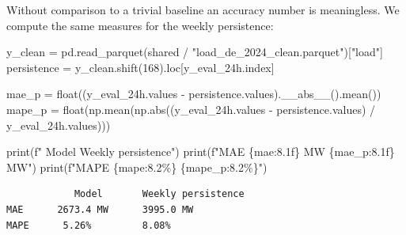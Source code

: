 \documentclass[
  english,
  letterpaper,
]{scrbook}
\newenvironment{Shaded}{\begin{snugshade}}{\end{snugshade}}
\newcommand{\BuiltInTok}[1]{\textcolor[rgb]{0.00,0.23,0.31}{#1}}
\newcommand{\DecValTok}[1]{\textcolor[rgb]{0.68,0.00,0.00}{#1}}
\newcommand{\FunctionTok}[1]{\textcolor[rgb]{0.28,0.35,0.67}{#1}}
\newcommand{\NormalTok}[1]{\textcolor[rgb]{0.00,0.23,0.31}{#1}}
\newcommand{\OperatorTok}[1]{\textcolor[rgb]{0.37,0.37,0.37}{#1}}
\newcommand{\SpecialCharTok}[1]{\textcolor[rgb]{0.37,0.37,0.37}{#1}}
\newcommand{\SpecialStringTok}[1]{\textcolor[rgb]{0.13,0.47,0.30}{#1}}
\newcommand{\StringTok}[1]{\textcolor[rgb]{0.13,0.47,0.30}{#1}}
\begin{document}
Without comparison to a trivial baseline an accuracy number is
meaningless. We compute the same measures for the weekly persistence:

\protect{}\label{baseline-metrics}
\begin{Shaded}
\begin{Highlighting}[]
\NormalTok{y\_clean }\OperatorTok{=}\NormalTok{ pd.read\_parquet(shared }\OperatorTok{/} \StringTok{"load\_de\_2024\_clean.parquet"}\NormalTok{)[}\StringTok{"load"}\NormalTok{]}
\NormalTok{persistence }\OperatorTok{=}\NormalTok{ y\_clean.shift(}\DecValTok{168}\NormalTok{).loc[y\_eval\_24h.index]}

\NormalTok{mae\_p  }\OperatorTok{=} \BuiltInTok{float}\NormalTok{((y\_eval\_24h.values }\OperatorTok{{-}}\NormalTok{ persistence.values).}\FunctionTok{\_\_abs\_\_}\NormalTok{().mean())}
\NormalTok{mape\_p }\OperatorTok{=} \BuiltInTok{float}\NormalTok{(np.mean(np.}\BuiltInTok{abs}\NormalTok{((y\_eval\_24h.values }\OperatorTok{{-}}\NormalTok{ persistence.values) }\OperatorTok{/}\NormalTok{ y\_eval\_24h.values)))}

\BuiltInTok{print}\NormalTok{(}\SpecialStringTok{f"            Model       Weekly persistence"}\NormalTok{)}
\BuiltInTok{print}\NormalTok{(}\SpecialStringTok{f"MAE    }\SpecialCharTok{\{}\NormalTok{mae}\SpecialCharTok{:8.1f\}}\SpecialStringTok{ MW    }\SpecialCharTok{\{}\NormalTok{mae\_p}\SpecialCharTok{:8.1f\}}\SpecialStringTok{ MW"}\NormalTok{)}
\BuiltInTok{print}\NormalTok{(}\SpecialStringTok{f"MAPE   }\SpecialCharTok{\{}\NormalTok{mape}\SpecialCharTok{:8.2\%\}}\SpecialStringTok{      }\SpecialCharTok{\{}\NormalTok{mape\_p}\SpecialCharTok{:8.2\%\}}\SpecialStringTok{"}\NormalTok{)}
\end{Highlighting}
\end{Shaded}

\begin{verbatim}
            Model       Weekly persistence
MAE      2673.4 MW      3995.0 MW
MAPE      5.26%         8.08%
\end{verbatim}
\end{document}

